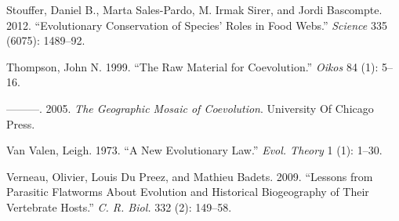 \documentclass[12pt]{article}
\begin{document}
Stouffer, Daniel B., Marta Sales-Pardo, M. Irmak Sirer, and Jordi
Bascompte. 2012. ``Evolutionary Conservation of Species' Roles in Food
Webs.'' \emph{Science} 335 (6075): 1489--92.

Thompson, John N. 1999. ``The Raw Material for Coevolution.''
\emph{Oikos} 84 (1): 5--16.

---------. 2005. \emph{The Geographic Mosaic of Coevolution}. University
Of Chicago Press.

Van Valen, Leigh. 1973. ``A New Evolutionary Law.'' \emph{Evol. Theory}
1 (1): 1--30.

Verneau, Olivier, Louis Du Preez, and Mathieu Badets. 2009. ``Lessons
from Parasitic Flatworms About Evolution and Historical Biogeography of
Their Vertebrate Hosts.'' \emph{C. R. Biol.} 332 (2): 149--58.

\singlespacing
\end{document}
